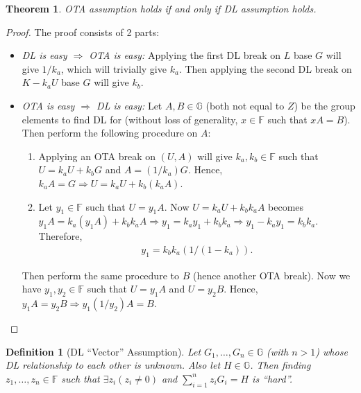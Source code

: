 \documentclass{article}
\newtheorem{definition}{Definition}[section]
\newtheorem{theorem}{Theorem}[section]
\begin{document}
\begin{theorem}
OTA assumption holds if and only if DL assumption holds.
\end{theorem}
\begin{proof}
The proof consists of 2 parts:
    \begin{itemize}
    \item \textit{DL is easy $\Rightarrow$ OTA is easy:} Applying the first DL break on $L$ base $G$ will give $1/k_a$, which will trivially give $k_a$. Then applying the second DL break on $K - k_a U$ base $G$ will give $k_b$.
    \item \textit{OTA is easy $\Rightarrow$ DL is easy:} Let $A, B\in\mathbb{G}$ (both not equal to $Z$) be the group elements to find DL for (without loss of generality, $x\in\mathbb{F}$ such that $xA=B$). Then perform the following procedure on $A$:
        \begin{enumerate}
        \item Applying an OTA break on $(U, A)$ will give $k_a, k_b\in\mathbb{F}$ such that $U = k_a U + k_b G$ and $A = (1/k_a)G$. Hence, $k_a A = G \Rightarrow U = k_a U + k_b (k_a A)$.
        \item Let $y_1\in\mathbb{F}$ such that $U=y_1 A$. Now $U = k_a U + k_b k_a A$ becomes $y_1 A = k_a (y_1 A) + k_b k_a A \Rightarrow y_1 = k_a y_1 + k_b k_a \Rightarrow y_1 - k_a y_1 = k_b k_a$. Therefore,
        \begin{align*}
            y_1 = k_b k_a (1/(1 - k_a)).
        \end{align*}
        \end{enumerate}
Then perform the same procedure to $B$ (hence another OTA break). Now we have $y_1, y_2\in\mathbb{F}$ such that $U=y_1 A$ and $U=y_2 B$. Hence, $y_1 A = y_2 B \Rightarrow  y_1(1/y_2) A = B$.
    \end{itemize}
\end{proof}

\begin{definition}[DL ``Vector'' Assumption]
Let $G_1,\ldots,G_n\in\mathbb{G}$ (with $n>1$) whose DL relationship to each other is unknown. Also let $H\in\mathbb{G}$. Then finding $z_1,\ldots,z_n\in\mathbb{F}$ such that $\exists z_i(z_i \neq 0)$ and $\sum_{i=1}^{n}{z_i G_i}=H$ is ``hard''.
\end{definition}
\end{document}
